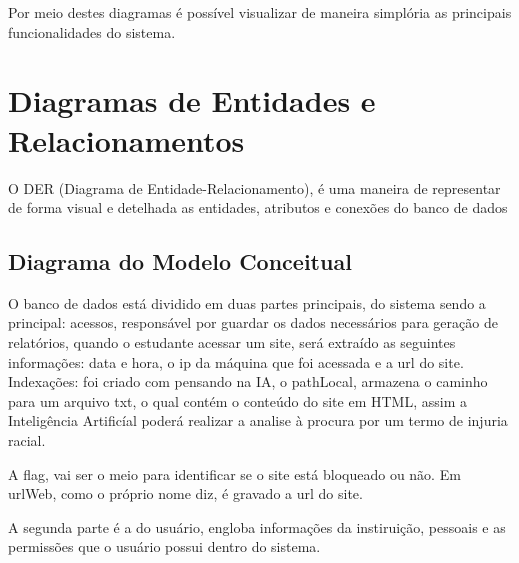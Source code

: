 \documentclass[
  a4paper,%
  12pt,%
  english,%
  brazilian,%
]{article}
\begin{document}
Por meio destes diagramas é possível visualizar de maneira simplória as principais funcionalidades do sistema.

\section*{Diagramas de Entidades e Relacionamentos}

O DER (Diagrama de Entidade-Relacionamento), é uma maneira de representar de forma visual e detelhada as entidades, atributos e conexões do banco de dados
\subsection*{Diagrama do Modelo Conceitual}
    O banco de dados está dividido em duas partes principais, do sistema sendo a principal: 
    acessos, responsável por guardar os dados necessários para geração de relatórios, quando o estudante acessar um site, será extraído as seguintes informações: data e hora, o ip da máquina que foi acessada e a url do site. Indexações: foi criado com pensando na IA, o pathLocal, armazena o caminho para um arquivo txt, o qual contém o conteúdo do site em HTML, assim a Inteligência Artificíal poderá realizar a analise à procura por um termo de injuria racial.
    
    A flag, vai ser o meio para identificar se o site está bloqueado ou não. Em urlWeb,  como o próprio nome diz, é gravado a url do site.
    
    A segunda parte é a do usuário, engloba informações da instiruição, pessoais e as permissões que o usuário possui dentro do sistema.
\end{document}
